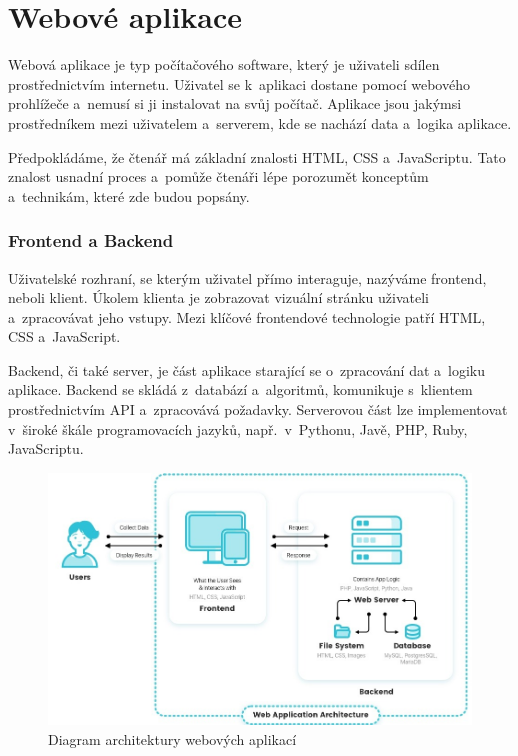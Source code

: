 \section{Webové aplikace}

Webová aplikace je typ počítačového software, který je uživateli sdílen prostřednictvím internetu. 
Uživatel se k~aplikaci dostane pomocí webového prohlížeče a~nemusí si ji instalovat na svůj počítač. 
Aplikace jsou jakýmsi prostředníkem mezi uživatelem a~serverem, kde se nachází data a~logika aplikace.\cite{codeacademywebapp}

Předpokládáme, že čtenář má základní znalosti HTML, CSS a~JavaScriptu. 
Tato znalost usnadní proces a~pomůže čtenáři lépe porozumět konceptům a~technikám, které zde budou popsány.

\subsubsection*{Frontend a Backend}

Uživatelské rozhraní, se kterým uživatel přímo interaguje, nazýváme frontend, neboli klient.
Úkolem klienta je zobrazovat vizuální stránku uživateli a~zpracovávat jeho vstupy. 
Mezi klíčové frontendové technologie patří HTML, CSS a~JavaScript.

Backend, či také server, je část aplikace starající se o~zpracování dat a~logiku aplikace. 
Backend se skládá z~databází a~algoritmů, komunikuje s~klientem prostřednictvím API a~zpracovává požadavky. 
Serverovou část lze implementovat v~široké škále programovacích jazyků, např.~v~Pythonu, Javě, PHP, Ruby, JavaScriptu.\cite{stateofartframeworks}

\begin{figure}[htb]
	\centering
		\includegraphics[width=1\textwidth]{images/webapparchitecture.jpg}
	\caption[Diagram architektury webových aplikací]{Diagram architektury webových aplikací \cite{webappsarchitecture}}
	\label{fig:webappsarchitecture}
\end{figure}

